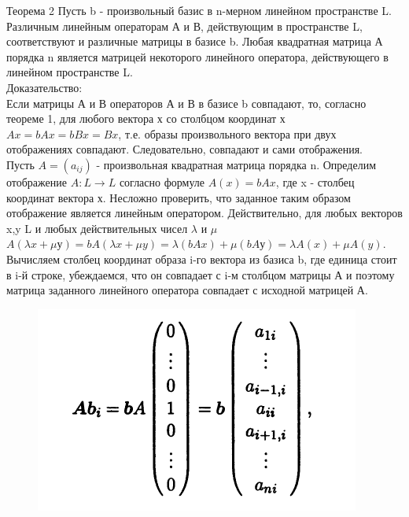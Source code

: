 \documentclass[12pt, oneside]{book}
\theoremstyle{definition}
\begin{document}
\begin{enumerate}
Теорема 2
Пусть b - произвольный базис в n-мерном линейном пространстве L. Различным линейным операторам А и В, действующим в пространстве L, соответствуют и различные матрицы в базисе b. Любая квадратная матрица А порядка n является матрицей некоторого линейного оператора, действующего в линейном пространстве L.\\
Доказательство:\\
Если матрицы А и В операторов А и В в базисе b совпадают, то, согласно теореме 1, для любого вектора х со столбцом координат х\\
$Ax=bAx=bBx=Bx$, т.е. образы произвольного вектора при двух отображениях совпадают. Следовательно, совпадают и сами отображения.\\
Пусть $A=(a_{ij})$ - произвольная квадратная матрица порядка n. Определим отображение $A: L \rightarrow L$ согласно формуле $A(x)=bAx$, где x  - столбец координат вектора х. Несложно проверить, что заданное таким образом отображение является линейным оператором. Действительно, для любых векторов x,y \in L и любых действительных чисел $\lambda$ и $\mu$ \\
$A(\lambda x + \mu у) = bA(\lambda x + \mu y) = \lambda (bAx) + \mu (bAу) = \lambda A(x) + \mu A(y)$.\\
Вычисляем столбец координат образа  i-го вектора из базиса b, где единица стоит в i-й строке, убеждаемся, что он совпадает с i-м столбцом матрицы А и поэтому матрица заданного линейного оператора совпадает с исходной матрицей А. 

\begin{figure}[h!]
\centering
\includegraphics[scale=0.6]{16-3.PNG}
\end{figure}\\


\end{enumerate}
\end{document}
